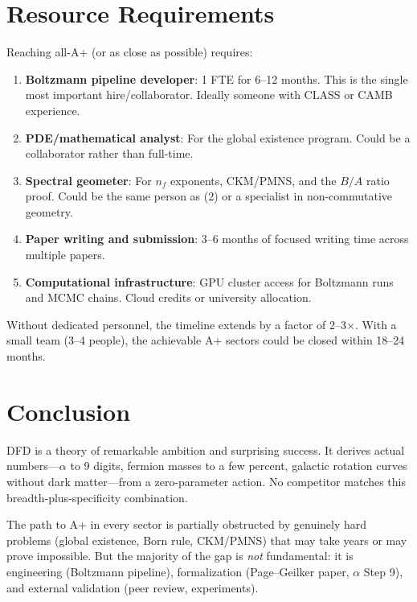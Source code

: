 \documentclass[11pt,a4paper]{article}
\begin{document}
\section{Resource Requirements}

Reaching all-A+ (or as close as possible) requires:

\begin{enumerate}
    \item \textbf{Boltzmann pipeline developer}: 1 FTE for 6--12 months. This is the single most important hire/collaborator. Ideally someone with CLASS or CAMB experience.
    \item \textbf{PDE/mathematical analyst}: For the global existence program. Could be a collaborator rather than full-time.
    \item \textbf{Spectral geometer}: For $n_f$ exponents, CKM/PMNS, and the $B/A$ ratio proof. Could be the same person as (2) or a specialist in non-commutative geometry.
    \item \textbf{Paper writing and submission}: 3--6 months of focused writing time across multiple papers.
    \item \textbf{Computational infrastructure}: GPU cluster access for Boltzmann runs and MCMC chains. Cloud credits or university allocation.
\end{enumerate}

\noindent Without dedicated personnel, the timeline extends by a factor of 2--3$\times$. With a small team (3--4 people), the achievable A+ sectors could be closed within 18--24 months.


\section{Conclusion}

DFD is a theory of remarkable ambition and surprising success. It derives actual numbers---$\alpha$ to 9 digits, fermion masses to a few percent, galactic rotation curves without dark matter---from a zero-parameter action. No competitor matches this breadth-plus-specificity combination.

The path to A+ in every sector is partially obstructed by genuinely hard problems (global existence, Born rule, CKM/PMNS) that may take years or may prove impossible. But the majority of the gap is \emph{not} fundamental: it is engineering (Boltzmann pipeline), formalization (Page--Geilker paper, $\alpha$ Step 9), and external validation (peer review, experiments).
\end{document}
